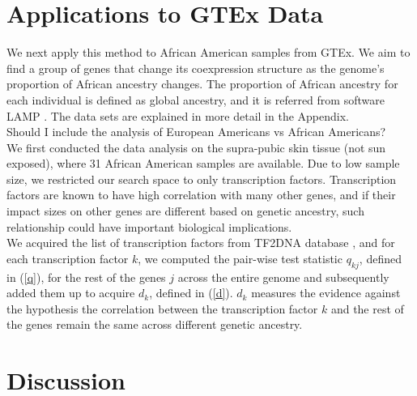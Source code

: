 \documentclass[12pt]{extarticle}
\theoremstyle{theorem}
\begin{document}


\section{Applications to GTEx Data}
We next apply this method to African American samples from GTEx. We aim to find a group of genes that change its coexpression structure as the genome's proportion of African ancestry changes. The proportion of African ancestry for each individual is defined as global ancestry, and it is referred from software LAMP \cite{pacsaniuc2009imputation}. The data sets are explained in more detail in the Appendix.\\

\noindent Should I include the analysis of European Americans vs African Americans? \\

\noindent We first conducted the data analysis on the supra-pubic skin tissue (not sun exposed), where 31 African American samples are available. Due to low sample size, we restricted our search space to only transcription factors. Transcription factors are known to have high correlation with many other genes, and if their impact sizes on other genes are different based on genetic ancestry, such relationship could have important biological implications. \\

\noindent We acquired the list of transcription factors from TF2DNA database \cite{pujato2014prediction}, and for each transcription factor $k$, we computed the pair-wise test statistic $q_{kj}$, defined in (\ref{q}), for the rest of the genes $j$ across the entire genome and subsequently added them up to acquire $d_k$, defined in (\ref{d}). $d_k$ measures the evidence against the hypothesis the correlation between the transcription factor $k$ and the rest of the genes remain the same across different genetic ancestry. 




\section{Discussion}
\end{document}
